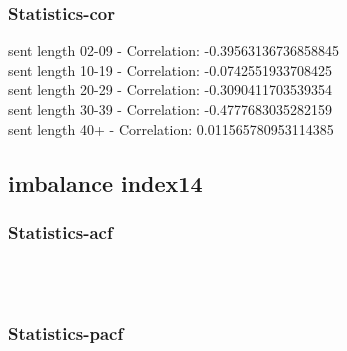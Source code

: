 \documentclass{article}%
\begin{document}
%
\newpage%
\subsubsection{Statistics{-}cor}%
\label{ssubsec:Statistics{-}cor}%
\noindent%
sent length 02-09 - Correlation: -0.39563136736858845\\%
sent length 10-19 - Correlation: -0.0742551933708425\\%
sent length 20-29 - Correlation: -0.3090411703539354\\%
sent length 30-39 - Correlation: -0.4777683035282159\\%
sent length 40+ - Correlation: 0.011565780953114385\\

%
\newpage

%
\subsection{imbalance index14}%
\label{subsec:imbalanceindex14}%
\subsubsection{Statistics{-}acf}%
\label{ssubsec:Statistics{-}acf}%


\begin{figure}[ht]%
\centering%
\setlength{\abovecaptionskip}{-35pt}%
%
%
\\%
%
%
\\%
%
\end{figure}

%
\newpage%
\subsubsection{Statistics{-}pacf}%
\label{ssubsec:Statistics{-}pacf}%
\end{document}
